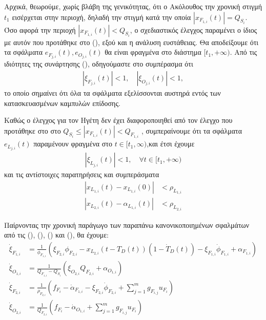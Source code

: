 \bigskip
\begin{proof_of_theorem}\label{proof_of_the:main}

\bigskip
Αρχικά, θεωρούμε, χωρίς βλάβη της γενικότητας, ότι ο Ακόλουθος την χρονική στιγμή $t_1$ εισέρχεται στην περιοχή, δηλαδή την στιγμή κατά την οποία $|x_{F_{1, i}}(t)| = Q_{S_{i}}$. Όσο αφορά την περιοχή $|x_{F_{1, i}}(t)| < Q_{S_{i}}$, ο σχεδιαστικός έλεγχος παραμένει ο ίδιος με αυτόν που προτάθηκε στο (\cite{BIKAS20239972}), εξού και η ανάλυση ευστάθειας.
Θα αποδείξουμε ότι τα σφάλματα $e_{F_{j,i}}(t), e_{O_{j,i}}(t)$ θα είναι φραγμένα στο διάστημα $[t_1, +\infty)$. Από τις ιδιότητες της συνάρτησης (), οδηγούμαστε στο συμπέρασμα ότι
\begin{align*}
\left|\xi_{F_{j,i}}(t)\right|<1, \quad \left|\xi_{O_{j,i}}(t)\right|<1,
\end{align*}
το οποίο σημαίνει ότι όλα τα σφάλματα εξελίσσονται αυστηρά εντός των κατασκευασμένων καμπυλών επίδοσης.

\bigskip
Καθώς ο έλεγχος για τον Ηγέτη δεν έχει διαφοροποιηθεί από τον έλεγχο που προτάθηκε στο \cite{BIKAS20239972} στο $Q_{S_{i}} \leq |x_{F_{1, i}}(t)| < Q_{F_{1, i}}$ , συμπεραίνουμε	ότι τα σφάλματα $e_{L_{j,i}}(t)$ παραμένουν φραγμένα στο $t \in[t_1, \infty)$,και έτσι έχουμε
\begin{align*}
\left| \xi_{L_{j,i}}(t) \right| < 1, \quad \forall t\in[t_1, +\infty)
\end{align*}
και τις αντίστοιχες παρατηρήσεις και συμπεράσματα
\begin{align}
|x_{L_{1,i}}(t) - x_{L_{1,i}}(0)| &< \rho_{L_{1,i}} \label{conclusionL1} \\
|x_{L_{2,i}}(t) - \alpha_{L_{1,i}}(t)| &< \rho_{L_{2,i}} \label{conclusionL2}
\end{align}

\bigskip
Παίρνοντας την χρονική παράγωγο των παραπάνω κανονικοποιημένων σφαλμάτων από τις (), (), () και (), θα έχουμε:
\begin{align}
\dot{\xi}_{F_{1, i}} &= \frac{1}{\phi_{F_{1,i}}}\left(\xi_{F_{2,i}}\phi_{F_{2,i}} - x_{L_{2,i}}(t-T_D(t))(1-\dot{T}_{D}(t)) - \xi_{F_{1,i}}\dot{\phi}_{F_{1,i}} + \alpha_{F_{1,i}}\right) \label{dotxiF1} \\
\dot{\xi}_{O_{1, i}} &= \frac{1}{Q_{F_{1, i}} - Q_{S_{i}}}\left(\xi_{O_{2, i}}Q_{F_{2, i}} + \alpha_{O_{1, i}}\right) \label{dotxiO1} \\
\dot{\xi}_{F_{2, i}} &= \frac{1}{\rho_{F_{2,i}}}\left(f_{F_{i}} - \dot{\alpha}_{F_{1,i}} - \xi_{F_{2, i}}\dot{\phi}_{F_{2, i}} + \sum_{j=1}^{m}g_{F_{i,j}}u_{F_{i}}\right) \label{dotxiF2} \\
\dot{\xi}_{O_{2, i}} &= \frac{1}{Q_{F_{2,i}}}\left(f_{F_{i}} - \dot{\alpha}_{O_{1,i}} + \sum_{j=1}^{m}g_{F_{i,j}}u_{F_{i}}\right) \label{dotxiO2}
\end{align}


\end{proof_of_theorem}
